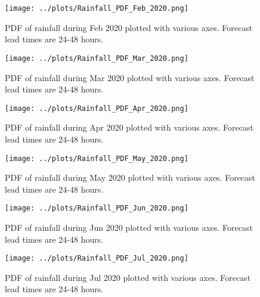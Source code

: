 \documentclass[12pt]{article}
\begin{document}
\begin{figure}
\begin{center}
\texttt{[image: ../plots/Rainfall\_PDF\_Feb\_2020.png]}
\end{center}
\caption{PDF of rainfall during Feb 2020 plotted with various axes. Forecast lead times are 24-48 hours.}
\end{figure}

\begin{figure}
\begin{center}
\texttt{[image: ../plots/Rainfall\_PDF\_Mar\_2020.png]}
\end{center}
\caption{PDF of rainfall during Mar 2020 plotted with various axes. Forecast lead times are 24-48 hours.}
\end{figure}

\begin{figure}
\begin{center}
\texttt{[image: ../plots/Rainfall\_PDF\_Apr\_2020.png]}
\end{center}
\caption{PDF of rainfall during Apr 2020 plotted with various axes. Forecast lead times are 24-48 hours.}
\end{figure}

\begin{figure}
\begin{center}
\texttt{[image: ../plots/Rainfall\_PDF\_May\_2020.png]}
\end{center}
\caption{PDF of rainfall during May 2020 plotted with various axes. Forecast lead times are 24-48 hours.}
\end{figure}

\begin{figure}
\begin{center}
\texttt{[image: ../plots/Rainfall\_PDF\_Jun\_2020.png]}
\end{center}
\caption{PDF of rainfall during Jun 2020 plotted with various axes. Forecast lead times are 24-48 hours.}
\end{figure}

\begin{figure}
\begin{center}
\texttt{[image: ../plots/Rainfall\_PDF\_Jul\_2020.png]}
\end{center}
\caption{PDF of rainfall during Jul 2020 plotted with various axes. Forecast lead times are 24-48 hours.}
\end{figure}
\end{document}
